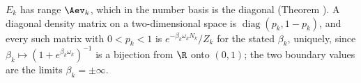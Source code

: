 $E_k$ has range $\Aev_k$, which in the number basis is the diagonal (Theorem ). A diagonal density matrix on a two-dimensional space is $\operatorname{diag}(p_k, 1-p_k)$, and every such matrix with $0 < p_k < 1$ is $e^{-\beta_k \omega_k N_k}/Z_k$ for the stated $\beta_k$, uniquely, since $\beta_k \mapsto (1 + e^{\beta_k\omega_k})^{-1}$ is a bijection from $\R$ onto $(0,1)$; the two boundary values are the limits $\beta_k = \pm\infty$.
